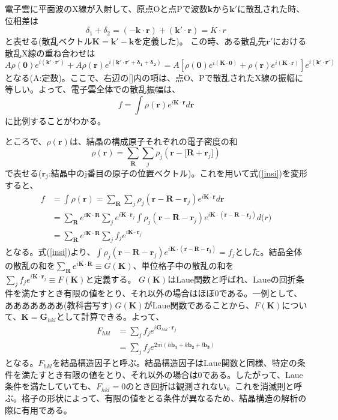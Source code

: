 \documentclass[11pt,a4j,uplatex]{jsarticle}
\begin{document}
電子雲に平面波のX線が入射して、原点Oと点Pで波数$\bm{k}$から$\bm{k}'$に散乱された時、位相差は
\begin{equation}
  \delta_1+\delta_2=\bm{(-k\cdot r)+(k'\cdot r)}=K\cdot r
\end{equation}
と表せる(散乱ベクトル$\bm{K=k'-k}$を定義した)。
この時、ある散乱先$\bm{r'}$における散乱X線の重ね合わせは
\begin{equation}
  A\rho\bm{(0)}e^{i(\bm{k'\cdot r'})}+  A\rho\bm{(r)}e^{i(\bm{k'\cdot r'+\delta_1+\delta_2})}=A[\rho\bm{(0)}e^{i(\bm{K\cdot 0})}+\rho\bm{(r)}e^{i(\bm{K\cdot r})}]e^{i(\bm{k'\cdot r'})}
\end{equation}
となる(A:定数)。ここで、右辺の[]内の項は、点O、Pで散乱されたX線の振幅に等しい。よって、電子雲全体での散乱振幅は、
\begin{equation}
  f=\int\rho(\bm{r})e^{i\bm{K\cdot r}}d\bm{r}
  \label{insi}
\end{equation}
に比例することがわかる。

\newpage
ところで、$\rho(\bm{r})$は、結晶の構成原子それぞれの電子密度の和
\begin{equation}
  \rho(\bm{r})=\sum_{\bm{R}}\sum_j\rho_j(\bm{r-[R+}\bm{r}_j])
\end{equation}
で表せる($\bm{r}_j$:結晶中のj番目の原子の位置ベクトル)。これを用いて式(\ref{insi})を変形すると、
\begin{equation}
  \begin{split}
  f&=\int\rho(\bm{r})=\sum_{\bm{R}}\sum_j\rho_j(\bm{r-R-}\bm{r}_j)e^{i\bm{K\cdot r}}d\bm{r}\\
  &=\sum_{\bm{R}}e^{i\bm{K\cdot R}}\sum_je^{i\bm{K}\cdot\bm{r}_j}\int\rho_j(\bm{r-R-}\bm{r}_j)e^{i\bm{K\cdot (\bm{r-R-}\bm{r}_j)}}d\bm(r)\\
  &=\sum_{\bm{R}}e^{i\bm{K\cdot R}}\sum_jf_je^{i\bm{K}\cdot\bm{r}_j}
\end{split}
\end{equation}
となる。式(\ref{insi})より、$\int\rho_j(\bm{r-R-}\bm{r}_j)e^{i\bm{K\cdot (\bm{r-R-}\bm{r}_j)}}=f_j$とした。結晶全体の散乱の和を$\sum_{\bm{R}}e^{i\bm{K\cdot R}}\equiv G(\bm{K})$、単位格子中の散乱の和を$\sum_jf_je^{i\bm{K}\cdot\bm{r}_j}\equiv F(\bm{K})$と定義する。
$G(\bm{K})$はLaue関数と呼ばれ、Laueの回折条件を満たすとき有限の値をとり、それ以外の場合はほぼ0である。一例として、あああああああ(教科書写す)
$G(\bm{K})$がLaue関数であることから、$F(\bm{K})$について、$\bm{K}=\bm{G}_{hkl}$として計算できる。よって、
\begin{equation}
\begin{split}
    F_{hkl}&=\sum_jf_je^{i\bm{G}_{hkl}\cdot\bm{r}_j}\\
    &=\sum_jf_je^{2\pi i(h\bm{b_1}+k\bm{b_2}+l\bm{b_3})}
\end{split}
\end{equation}
となる。$F_{hkl}$を結晶構造因子と呼ぶ。結晶構造因子はLaue関数と同様、特定の条件を満たすとき有限の値をとり、それ以外の場合は0である。したがって、Laue条件を満たしていても、$F_{hkl}=0$のとき回折は観測されない。これを消滅則と呼ぶ。格子の形状によって、有限の値をとる条件が異なるため、結晶構造の解析の際に有用である。
\end{document}
